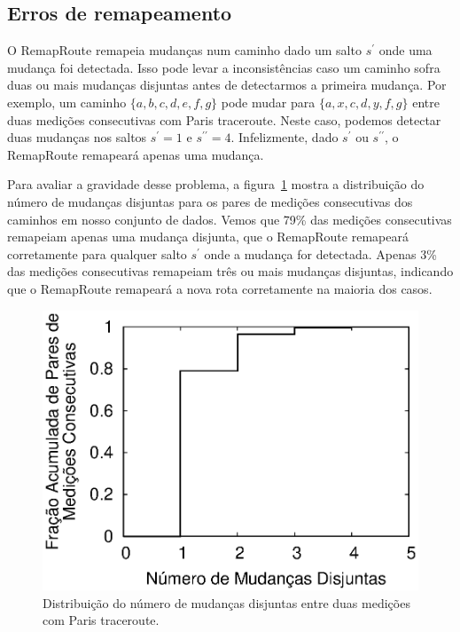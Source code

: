 \documentclass{JBCS}
\newcommand{\rmprt}{{Re\-map\-Rou\-te}}
\newcommand{\figstr}{figura}
\begin{document}
\subsection{Erros de remapeamento}

O \rmprt{} remapeia mudanças num caminho dado um salto $s^\prime$ onde
uma mudança foi detectada.  Isso pode levar a inconsistências caso um
caminho sofra duas ou mais mudanças disjuntas antes de detectarmos a
primeira mudança.  Por exemplo, um caminho $\{a, b, c, d, e, f, g\}$
pode mudar para $\{a, x, c, d, y, f, g\}$ entre duas medições
consecutivas com Paris traceroute.  Neste caso, podemos detectar duas
mudanças nos saltos $s^\prime = 1$ e $s^{\prime\prime} = 4$.
Infelizmente, dado $s^\prime$ ou $s^{\prime\prime}$, o \rmprt{}
remapeará apenas uma mudança.

Para avaliar a gravidade desse problema, a
\figstr~\ref{fig:sim.ndisjoint} mostra a distribuição do número de
mudanças disjuntas para os pares de medições consecutivas dos caminhos
em nosso conjunto de dados.\footnotemark{}  Vemos que 79\% das medições
consecutivas remapeiam apenas uma mudança disjunta, que o \rmprt{}
remapeará corretamente para qualquer salto $s^\prime$ onde a mudança for
detectada.  Apenas 3\% das medições consecutivas remapeiam três ou mais
mudanças disjuntas, indicando que o \rmprt{} remapeará a nova rota
corretamente na maioria dos casos.


\begin{figure}
\begin{center}
\includegraphics[width=0.96\columnwidth]{figs/ndisjoint.eps}
\caption{Distribuição do número de mudanças disjuntas entre duas
medições com Paris traceroute.}
\label{fig:sim.ndisjoint}
\end{center}
\end{figure}
\end{document}
